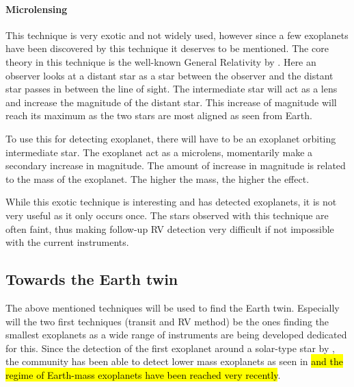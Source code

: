 \paragraph{Microlensing}

This technique is very exotic and not widely used, however since a few exoplanets have been
discovered by this technique it deserves to be mentioned. The core theory in this technique is the
well-known General Relativity by \citet{Einstein1916}. Here an observer looks at a distant star as a
star between the observer and the distant star passes in between the line of sight. The intermediate
star will act as a lens and increase the magnitude of the distant star. This increase of magnitude
will reach its maximum as the two stars are most aligned as seen from Earth.

To use this for detecting exoplanet, there will have to be an exoplanet orbiting intermediate star.
The exoplanet act as a microlens, momentarily make a secondary increase in magnitude. The amount of
increase in magnitude is related to the mass of the exoplanet. The higher the mass, the higher the
effect.

While this exotic technique is interesting and has detected exoplanets, it is not very useful as it
only occurs once. The stars observed with this technique are often faint, thus making follow-up RV
detection very difficult if not impossible with the current instruments.


\subsection{Towards the Earth twin}

The above mentioned techniques will be used to find the Earth twin. Especially will the two first
techniques (transit and RV method) be the ones finding the smallest exoplanets as a wide range of
instruments are being developed dedicated for this. Since the detection of the first exoplanet around a solar-type star by \citet{Mayor1995}, the
community has been able to detect lower mass exoplanets as seen in  \hl{and
the regime of Earth-mass exoplanets have been reached very recently}.

